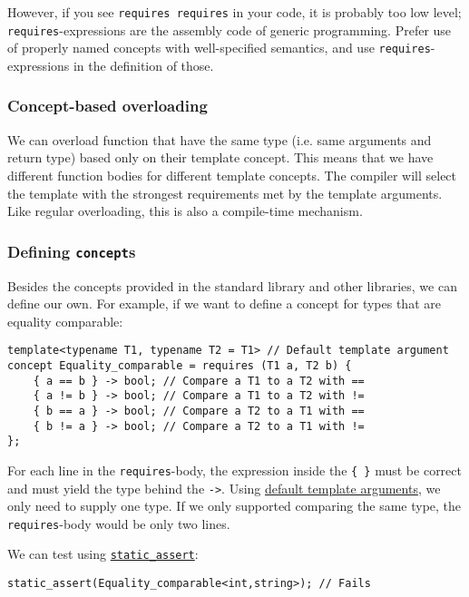 \documentclass[8pt, table, xcdraw]{article}%
\begin{document}
However, if you see \lstinline{requires requires} in your code, it is probably too low level; \lstinline{requires}-expressions are the assembly code of generic programming. Prefer use of properly named concepts with well-specified semantics, and use \lstinline{requires}-expressions in the definition of those.

\subsubsection{Concept-based overloading}

We can overload function that have the same type (i.e. same arguments and return type) based only on their template concept. This means that we have different function bodies for different template concepts. The compiler will select the template with the strongest requirements met by the template arguments. Like regular overloading, this is also a compile-time mechanism.

\subsubsection{Defining \lstinline{concept}s}

Besides the concepts provided in the standard library and other libraries, we can define our own. For example, if we want to define a concept for types that are equality comparable:

\begin{lstlisting}
template<typename T1, typename T2 = T1> // Default template argument
concept Equality_comparable = requires (T1 a, T2 b) {
    { a == b } -> bool; // Compare a T1 to a T2 with ==
    { a != b } -> bool; // Compare a T1 to a T2 with !=
    { b == a } -> bool; // Compare a T2 to a T1 with ==
    { b != a } -> bool; // Compare a T2 to a T1 with !=
};
\end{lstlisting}

For each line in the  \lstinline{requires}-body, the expression inside the \lstinline|{ }| must be correct and must yield the type behind the \lstinline{->}. Using \hyperref[default_template_arguments]{default template arguments}, we only need to supply one type. If we only supported comparing the same type, the \lstinline{requires}-body would be only two lines.

We can test using \hyperref[static_assert]{\lstinline{static_assert}}:

\begin{lstlisting}
static_assert(Equality_comparable<int,string>); // Fails
\end{lstlisting}
\end{document}
